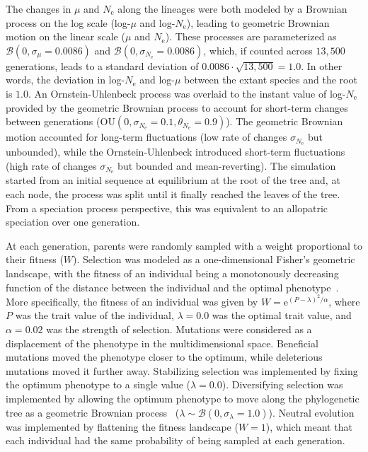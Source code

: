 \documentclass{article}
\newcommand{\Multiply}{\cdot}
\newcommand{\e}{\text{e}}
\newcommand{\Ne}{N_{\text{e}}}
\newcommand{\Trait}{P}
\newcommand{\MutationRatePheno}{\mu}
\newcommand{\brownian}{\mathcal{B}}
\begin{document}
The changes in $\MutationRatePheno$ and $\Ne$ along the lineages were both modeled by a Brownian process on the log scale (log-$\MutationRatePheno$ and log-$\Ne$), leading to geometric Brownian motion on the linear scale ($\MutationRatePheno$ and $\Ne$).
These processes are parameterized as $\brownian \left(0, \sigma_{\MutationRatePheno}=0.0086\right)$ and $\brownian \left(0, \sigma_{\Ne}=0.0086\right)$, which, if counted across $13,500$ generations, leads to a standard deviation of $0.0086 \Multiply \sqrt {13,500} = 1.0$.
In other words, the deviation in log-$\Ne$ and log-$\MutationRatePheno$  between the extant species and the root is $1.0$.
An Ornstein-Uhlenbeck process was overlaid to the instant value of log-$\Ne$ provided by the geometric Brownian process to account for short-term changes between generations ($\text{OU} \left(0, \sigma_{\Ne}=0.1, \theta_{\Ne}=0.9\right)$).
The geometric Brownian motion accounted for long-term fluctuations (low rate of changes $\sigma_{\Ne}$ but unbounded), while the Ornstein-Uhlenbeck introduced short-term fluctuations (high rate of changes $\sigma_{\Ne}$ but bounded and mean-reverting).
The simulation started from an initial sequence at equilibrium at the root of the tree and, at each node, the process was split until it finally reached the leaves of the tree.
From a speciation process perspective, this was equivalent to an allopatric speciation over one generation.

At each generation, parents were randomly sampled with a weight proportional to their fitness ($W$).
Selection was modeled as a one-dimensional Fisher's geometric landscape, with the fitness of an individual being a monotonously decreasing function of the distance between the individual and the optimal phenotype~\citep{tenaillon_utility_2014,blanquart_epistasis_2016}.
More specifically, the fitness of an individual was given by $W = \e^{(\Trait - \lambda)^2/ \alpha}$, where $\Trait$ was the trait value of the individual, $\lambda=0.0$ was the optimal trait value, and $\alpha=0.02$ was the strength of selection.
Mutations were considered as a displacement of the phenotype in the multidimensional space.
Beneficial mutations moved the phenotype closer to the optimum, while deleterious mutations moved it further away.
Stabilizing selection was implemented by fixing the optimum phenotype to a single value ($\lambda=0.0$).
Diversifying selection was implemented by allowing the optimum phenotype to move along the phylogenetic tree as a geometric Brownian process~\citep{hansen_stabilizing_1997} ($\lambda \sim \brownian \left(0, \sigma_{\lambda}=1.0\right)$).
Neutral evolution was implemented by flattening the fitness landscape ($W=1$), which meant that each individual had the same probability of being sampled at each generation.
\end{document}
